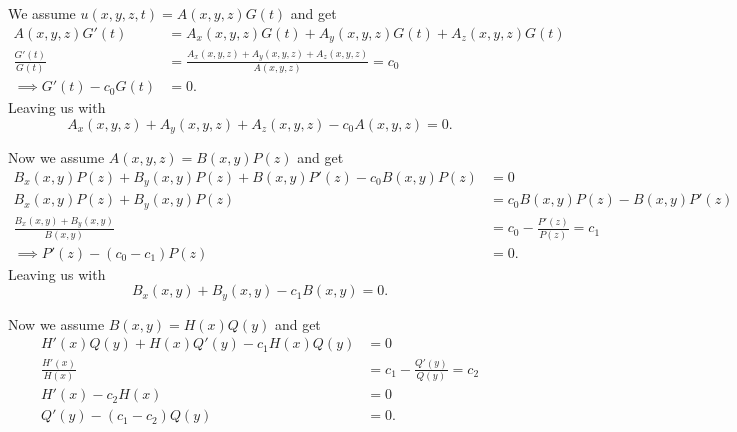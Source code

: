 \begin{derivation}
  We assume $u(x,y,z,t) = A(x,y,z) G(t)$ and get
  \begin{align*}
    A(x,y,z) G'(t) &= A_x(x,y,z)G(t) + A_y(x,y,z) G(t) + A_z (x,y,z)G(t)  \\
    \frac{G'(t)}{G(t)} &= \frac{A_x(x,y,z) + A_y(x,y,z) + A_z(x,y,z)}{A(x,y,z)} = c_0 \\
    \implies G'(t) - c_0 G(t) &= 0
  .\end{align*}
  Leaving us with
  \begin{equation*}
    A_x (x,y,z) + A_y(x,y,z) + A_z(x,y,z) - c_0 A(x,y,z) = 0
  .\end{equation*}
  
  Now we assume $A(x,y,z) = B(x,y) P(z)$ and get
  \begin{align*}
    B_x(x,y) P(z) + B_y(x,y) P(z) + B(x,y) P'(z) - c_0 B(x,y) P(z) &= 0 \\
    B_x(x,y) P(z) + B_y(x,y) P(z) &= c_0 B(x,y) P(z) - B(x,y) P'(z) \\
    \frac{B_x (x,y) + B_y(x,y)}{B(x,y)} &= c_0 - \frac{P'(z)}{P(z)} = c_1 \\
    \implies P'(z) - (c_0 - c_1 ) P(z) &= 0
  .\end{align*}
  Leaving us with
  \begin{equation*}
    B_x (x,y) + B_y(x,y) - c_1 B(x,y) = 0
  .\end{equation*}
  
  Now we assume $B(x,y) = H(x) Q(y)$ and get
  \begin{align*}
    H'(x) Q(y) + H(x) Q'(y) - c_1 H(x) Q(y) &= 0 \\
    \frac{H'(x)}{H(x)} &= c_1 - \frac{Q'(y)}{Q(y)} = c_2 \\
    H'(x) - c_2 H(x) &= 0 \\
    Q'(y) - (c_1 - c_2) Q(y) &= 0
  .\end{align*}
\end{derivation}


